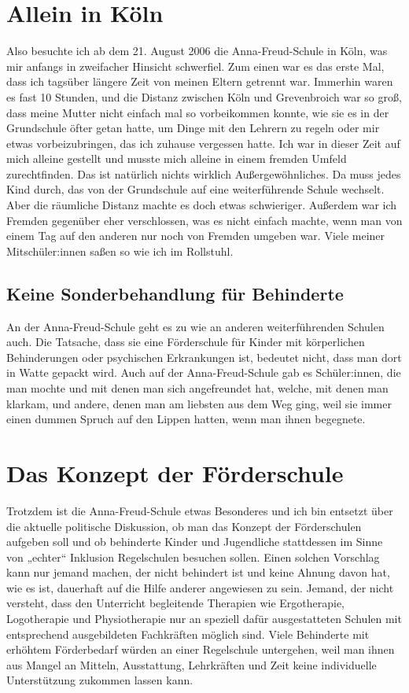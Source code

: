 \documentclass[fontsize=14pt,a4paper,headinclude,DIV=calc,automark]{scrbook}
\begin{document}
\section{Allein in Köln}

Also besuchte ich ab dem 21. August 2006 die Anna-Freud-Schule in Köln, was mir anfangs in zweifacher Hinsicht schwerfiel. Zum einen war es das erste Mal, dass ich tagsüber längere Zeit von meinen Eltern getrennt war. Immerhin waren es fast 10 Stunden, und die Distanz zwischen Köln und Grevenbroich war so groß, dass meine Mutter nicht einfach mal so vorbeikommen konnte, wie sie es in der Grundschule öfter getan hatte, um Dinge mit den Lehrern zu regeln oder mir etwas vorbeizubringen, das ich zuhause vergessen hatte. Ich war in dieser Zeit auf mich alleine gestellt und musste mich alleine in einem fremden Umfeld zurechtfinden.
Das ist natürlich nichts wirklich Außergewöhnliches. Da muss jedes Kind durch, das von der Grundschule auf eine weiterführende Schule wechselt. Aber die räumliche Distanz machte es doch etwas schwieriger. Außerdem war ich Fremden gegenüber eher verschlossen, was es nicht einfach machte, wenn man von einem Tag auf den anderen nur noch von Fremden umgeben war. Viele meiner Mitschüler:innen saßen so wie ich im Rollstuhl.

\subsection{Keine Sonderbehandlung für Behinderte}

An der Anna-Freud-Schule geht es zu wie an anderen weiterführenden Schulen auch. Die Tatsache, dass sie eine Förderschule für Kinder mit körperlichen Behinderungen oder psychischen Erkrankungen ist, bedeutet nicht, dass man dort in Watte gepackt wird. Auch auf der Anna-Freud-Schule gab es Schüler:innen, die man mochte und mit denen man sich angefreundet hat, welche, mit denen man klarkam, und andere, denen man am liebsten aus dem Weg ging, weil sie immer einen dummen Spruch auf den Lippen hatten, wenn man ihnen begegnete.

\section{Das Konzept der Förderschule}

Trotzdem ist die Anna-Freud-Schule etwas Besonderes und ich bin entsetzt über die aktuelle politische Diskussion, ob man das Konzept der Förderschulen aufgeben soll und ob behinderte Kinder und Jugendliche stattdessen im Sinne von „echter“ Inklusion Regelschulen besuchen sollen. Einen solchen Vorschlag kann nur jemand machen, der nicht behindert ist und keine Ahnung davon hat, wie es ist, dauerhaft auf die Hilfe anderer angewiesen zu sein. Jemand, der nicht versteht, dass den Unterricht begleitende Therapien wie Ergotherapie, Logotherapie und Physiotherapie nur an speziell dafür ausgestatteten Schulen mit entsprechend ausgebildeten Fachkräften möglich sind. Viele Behinderte mit erhöhtem Förderbedarf würden an einer Regelschule untergehen, weil man ihnen aus Mangel an Mitteln, Ausstattung, Lehrkräften und Zeit keine individuelle Unterstützung zukommen lassen kann.
\end{document}
